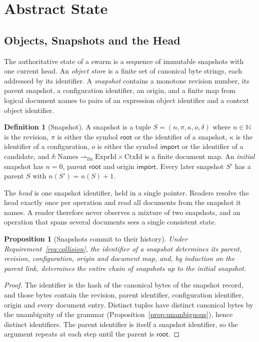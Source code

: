 \documentclass[11pt,a4paper]{article}
\theoremstyle{plain}
\newtheorem{proposition}[theorem]{Proposition}
\theoremstyle{definition}
\newtheorem{definition}[theorem]{Definition}
\theoremstyle{remark}
\theoremstyle{definition}
\begin{document}
\section{Abstract State}
\label{sec:state}

\subsection{Objects, Snapshots and the Head}

The authoritative state of a swarm is a sequence of immutable snapshots with one current head. An \emph{object store} is a finite set of canonical byte strings, each addressed by its identifier. A \emph{snapshot} contains a monotone revision number, its parent snapshot, a configuration identifier, an origin, and a finite map from logical document names to pairs of an expression object identifier and a context object identifier.

\begin{definition}[Snapshot]
A snapshot is a tuple $S = (n, \pi, \kappa, o, \delta)$ where $n \in \mathbb{N}$ is the revision, $\pi$ is either the symbol $\mathsf{root}$ or the identifier of a snapshot, $\kappa$ is the identifier of a configuration, $o$ is either the symbol $\mathsf{import}$ or the identifier of a candidate, and $\delta \colon \mathrm{Names} \rightharpoonup_{\mathrm{fin}} \mathrm{ExprId} \times \mathrm{CtxId}$ is a finite document map. An \emph{initial} snapshot has $n = 0$, parent $\mathsf{root}$ and origin $\mathsf{import}$. Every later snapshot $S'$ has a parent $S$ with $n(S') = n(S) + 1$.
\end{definition}

The \emph{head} is one snapshot identifier, held in a single pointer. Readers resolve the head exactly once per operation and read all documents from the snapshot it names. A reader therefore never observes a mixture of two snapshots, and an operation that spans several documents sees a single consistent state.

\begin{proposition}[Snapshots commit to their history]
\label{prop:merkle}
Under Requirement~\ref{req:collision}, the identifier of a snapshot determines its parent, revision, configuration, origin and document map, and, by induction on the parent link, determines the entire chain of snapshots up to the initial snapshot.
\end{proposition}

\begin{proof}
The identifier is the hash of the canonical bytes of the snapshot record, and those bytes contain the revision, parent identifier, configuration identifier, origin and every document entry. Distinct tuples have distinct canonical bytes by the unambiguity of the grammar (Proposition~\ref{prop:unambiguous}), hence distinct identifiers. The parent identifier is itself a snapshot identifier, so the argument repeats at each step until the parent is $\mathsf{root}$.
\end{proof}
\end{document}
